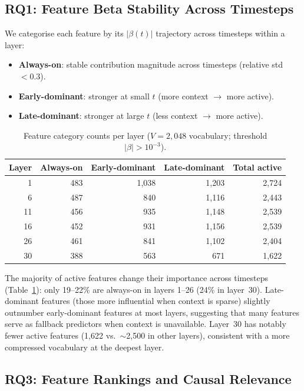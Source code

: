 \documentclass[11pt]{article}
\begin{document}
\subsection{RQ1: Feature Beta Stability Across Timesteps}

We categorise each feature by its $|\beta(t)|$ trajectory across timesteps within a layer:
\begin{itemize}
    \item \textbf{Always-on}: stable contribution magnitude across timesteps (relative std $< 0.3$).
    \item \textbf{Early-dominant}: stronger at small $t$ (more context $\to$ more active).
    \item \textbf{Late-dominant}: stronger at large $t$ (less context $\to$ more active).
\end{itemize}

\begin{table}[h]
\centering
\caption{Feature category counts per layer ($V = 2{,}048$ vocabulary; threshold $|\beta| > 10^{-3}$).}
\label{tab:beta_stability}
\begin{tabular}{r rrrr}
\toprule
\textbf{Layer} & \textbf{Always-on} & \textbf{Early-dominant} & \textbf{Late-dominant} & \textbf{Total active} \\
\midrule
1  & 483 & 1,038 & 1,203 & 2,724 \\
6  & 487 &   840 & 1,116 & 2,443 \\
11 & 456 &   935 & 1,148 & 2,539 \\
16 & 452 &   931 & 1,156 & 2,539 \\
26 & 461 &   841 & 1,102 & 2,404 \\
30 & 388 &   563 &   671 & 1,622 \\
\bottomrule
\end{tabular}
\end{table}

The majority of active features change their importance across timesteps (Table~\ref{tab:beta_stability}): only 19--22\% are always-on in layers 1--26 (24\% in layer~30).
Late-dominant features (those more influential when context is sparse) slightly outnumber early-dominant features at most layers, suggesting that many features serve as fallback predictors when context is unavailable.
Layer~30 has notably fewer active features (1,622 vs.\ $\sim$2,500 in other layers), consistent with a more compressed vocabulary at the deepest layer.

\subsection{RQ3: Feature Rankings and Causal Relevance}
\end{document}
